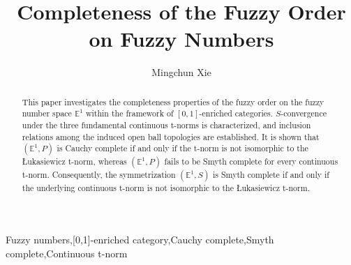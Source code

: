 \documentclass[preprint,3p,times]{elsarticle}
\theoremstyle{plain}
\theoremstyle{definition}
\numberwithin{equation}{section}
\begin{document}
\begin{frontmatter}



\title{Completeness of the Fuzzy Order on Fuzzy Numbers
}



\author{Mingchun Xie}

\address{School of Mathematics, Sichuan University, Chengdu 610064, China}

\begin{abstract}
This paper investigates the completeness properties  of the fuzzy order on the fuzzy number space $\mathbb{E}^1$ within the framework of $[0,1]$-enriched categories. \(S\)-convergence under the three fundamental continuous t-norms is characterized, and inclusion relations among the induced open ball topologies are established. It is shown that $(\mathbb{E}^1,P)$ is Cauchy complete if and only if the t-norm is not isomorphic to the {\L}ukasiewicz t-norm, whereas $(\mathbb{E}^1,P)$ fails to be Smyth complete for every continuous t-norm. Consequently, the symmetrization $(\mathbb{E}^1,S)$ is Smyth complete if and only if the underlying continuous t-norm is not isomorphic to the {\L}ukasiewicz t-norm.


\end{abstract}

\begin{keyword}
Fuzzy numbers\sep [0,1]-enriched category\sep Cauchy complete\sep Smyth complete\sep Continuous t-norm  

\end{keyword}

\end{frontmatter}
\end{document}
